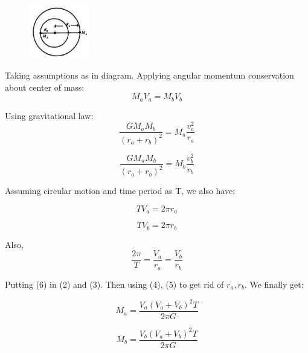 \documentclass[12pt, letterpaper]{article}
\begin{document}
\begin{figure}[h]
	\centering
    \includegraphics[width = 100px]{two}
\end{figure}

Taking assumptions as in diagram. Applying angular momentum conservation about center of mass:
\begin{equation}
	M_aV_a = M_bV_b
\end{equation}

Using gravitational law:
\begin{equation}
\frac{GM_aM_b}{(r_a + r_b)^2} = M_a\frac{v_a^2}{r_a}
\end{equation}

\begin{equation}
\frac{GM_aM_b}{(r_a + r_b)^2} = M_b\frac{v_b^2}{r_b}
\end{equation}

Assuming circular motion and time period as T, we also have:

\begin{equation}
TV_a = 2\pi r_a
\end{equation}

\begin{equation}
TV_b = 2\pi r_b
\end{equation}

Also,
\begin{equation}
	\frac{2\pi}{T} = \frac{V_a}{r_a} = \frac{V_b}{r_b}
\end{equation}

Putting (6) in (2) and (3). Then using (4), (5) to get rid of $r_a,r_b$. We finally get:


\begin{equation}
M_a = \frac{V_a(V_a+V_b)^2 T}{2 \pi G}
\end{equation}

\begin{equation}
M_b = \frac{V_b(V_a+V_b)^2 T}{2 \pi G}
\end{equation}
\end{document}
